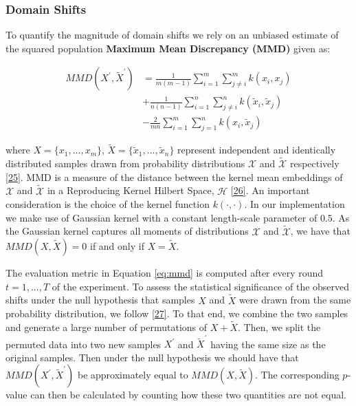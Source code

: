 \documentclass[conference,final,]{IEEEtran}
\begin{document}
\hypertarget{domain-shifts}{%
\subsubsection{Domain Shifts}\label{domain-shifts}}

To quantify the magnitude of domain shifts we rely on an unbiased estimate of the squared population \textbf{Maximum Mean Discrepancy (MMD)} given as:

\begin{equation}
\begin{aligned}
MMD({X}^\prime,\tilde{X}^\prime) &= \frac{1}{m(m-1)}\sum_{i=1}^m\sum_{j\neq i}^m k(x_i,x_j) \\ &+ \frac{1}{n(n-1)}\sum_{i=1}^n\sum_{j\neq i}^n k(\tilde{x}_i,\tilde{x}_j) \\ &- \frac{2}{mn}\sum_{i=1}^m\sum_{j=1}^n k(x_i,\tilde{x}_j) \label{eq:mmd}
\end{aligned}
\end{equation}

where \(X=\{x_1,...,x_m\}\), \(\tilde{X}=\{\tilde{x}_1,...,\tilde{x}_n\}\) represent independent and identically distributed samples drawn from probability distributions \(\mathcal{X}\) and \(\mathcal{\tilde{X}}\) respectively \protect\hyperlink{ref-gretton2012kernel}{{[}25{]}}. MMD is a measure of the distance between the kernel mean embeddings of \(\mathcal{X}\) and \(\mathcal{\tilde{X}}\) in a Reproducing Kernel Hilbert Space, \(\mathcal{H}\) \protect\hyperlink{ref-berlinet2011reproducing}{{[}26{]}}. An important consideration is the choice of the kernel function \(k(\cdot,\cdot)\). In our implementation we make use of Gaussian kernel with a constant length-scale parameter of \(0.5\). As the Gaussian kernel captures all moments of distributions \(\mathcal{X}\) and \(\mathcal{\tilde{X}}\), we have that \(MMD(X,\tilde{X})=0\) if and only if \(X=\tilde{X}\).

The evaluation metric in Equation \eqref{eq:mmd} is computed after every round \(t=1,...,T\) of the experiment. To assess the statistical significance of the observed shifts under the null hypothesis that samples \(X\) and \(\tilde{X}\) were drawn from the same probability distribution, we follow \protect\hyperlink{ref-arcones1992bootstrap}{{[}27{]}}. To that end, we combine the two samples and generate a large number of permutations of \(X + \tilde{X}\). Then, we split the permuted data into two new samples \(X^\prime\) and \(\tilde{X}^\prime\) having the same size as the original samples. Then under the null hypothesis we should have that \(MMD(X^\prime,\tilde{X}^\prime)\) be approximately equal to \(MMD(X,\tilde{X})\). The corresponding \(p\)-value can then be calculated by counting how these two quantities are not equal.
\end{document}
